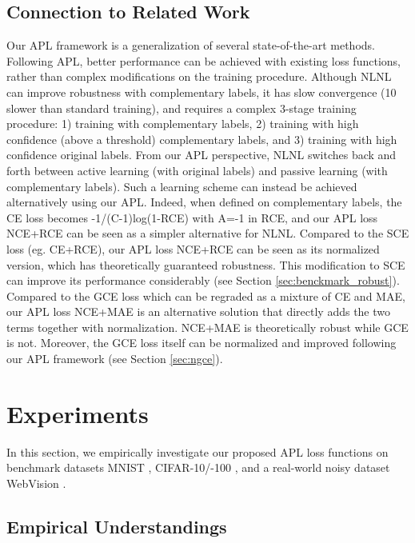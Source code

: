 \documentclass{article}
\begin{document}
\subsection{Connection to Related Work}
Our APL framework is a generalization of several state-of-the-art methods. Following APL, better performance can be achieved with existing loss functions, rather than complex modifications on the training procedure.
Although NLNL \cite{kim2019nlnl} can improve robustness with complementary labels, it has slow convergence (10 slower than standard training), and requires a complex 3-stage training procedure: 1) training with complementary labels, 2) training with high confidence (above a threshold) complementary labels, and 3) training with high confidence original labels. From our APL perspective, NLNL switches back and forth between active learning (with original labels) and passive learning (with complementary labels). Such a learning scheme can instead be achieved alternatively using our APL. 
Indeed, when defined on complementary labels, the CE loss becomes -1/(C-1)log(1-RCE) with A=-1 in RCE, and our APL loss NCE+RCE can be seen as a simpler alternative for NLNL.
Compared to the SCE \cite{wang2019symmetric} loss (eg. CE+RCE), our APL loss NCE+RCE can be seen as its normalized version, which has theoretically guaranteed robustness. This modification to SCE can improve its performance considerably (see Section \ref{sec:benckmark_robust}).
Compared to the GCE loss \cite{zhang2018generalized} which can be regraded as a mixture of CE and MAE, our APL loss NCE+MAE is an alternative solution that directly adds the two terms together with normalization. NCE+MAE is theoretically robust while GCE is not. Moreover, the GCE loss itself can be normalized and improved following our APL framework (see Section \ref{sec:ngce}).

\section{Experiments}\label{sec:experiments}
In this section, we empirically investigate our proposed APL loss functions on benchmark datasets MNIST \cite{lecun1998gradient}, CIFAR-10/-100
\cite{krizhevsky2009learning}, and a real-world noisy dataset WebVision \cite{li2017webvision}.


\subsection{Empirical Understandings}\label{sec:understanding}
\end{document}
